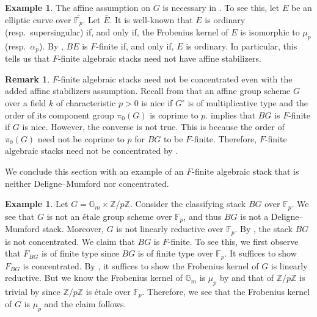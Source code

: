\documentclass[11pt]{amsart}
\theoremstyle{plain}
\theoremstyle{definition}
\newtheorem{example}[theorem]{Example}
\newtheorem{remark}[theorem]{Remark}
\numberwithin{equation}{section}
\numberwithin{theorem}{section}
\begin{document}
\begin{example}
    \label{ex:F-finite_elliptic_curves}
    The affine assumption on $G$ is necessary in . 
    To see this, let $E$ be an elliptic curve over $\overline{\mathbb{F}_p}$. 
    Let $\overline{E}$. 
    It is well-known that $E$ is ordinary (resp.\ supersingular) if, and only if, the Frobenius kernel of $E$ is isomorphic to $\mu_p$ (resp.\ $\alpha_p$). 
    By , $BE$ is $F$-finite if, and only if, $E$ is ordinary. 
    In particular, this tells us that $F$-finite algebraic stacks need not have affine stabilizers.
\end{example}

\begin{remark}
    $F$-finite algebraic stacks need not be concentrated even with the added affine stabilizers assumption. 
    Recall from \cite[Definition 1.1]{Hall/Rydh:2015} that an affine group scheme $G$ over a field $k$ of characteristic $p>0$ is nice if $G^\circ$ is of multiplicative type and the order of its component group $\pi_0(G)$ is coprime to $p$. 
     implies that $BG$ is $F$-finite if $G$ is nice. 
    However, the converse is not true. 
    This is because the order of $\pi_0(G)$ need not be coprime to $p$ for $BG$ to be $F$-finite. 
    Therefore, $F$-finite algebraic stacks need not be concentrated by \cite[Theorem B \& C]{Hall/Rydh:2015}.
\end{remark}

We conclude this section with an example of an $F$-finite algebraic stack that is neither Deligne--Mumford nor concentrated. 

\begin{example}
    \label{ex:F-finite_non_DM_non_tame}
    Let $G=\mathbb{G}_m\times\mathbb{Z}/p\mathbb{Z}$. 
    Consider the classifying stack $BG$ over $\mathbb{F}_p$. 
    We see that $G$ is not an \'{e}tale group scheme over $\mathbb{F}_p$, and thus $BG$ is not a Deligne--Mumford stack. 
    Moreover, $G$ is not linearly reductive over $\mathbb{F}_p$. 
    By \cite[Theorem B and C]{Hall/Rydh:2015}, the stack $BG$ is not concentrated.
    We claim that $BG$ is $F$-finite. 
    To see this, we first observe that $F_{BG}$ is of finite type since $BG$ is of finite type over $\mathbb{F}_p$. 
    It suffices to show $F_{BG}$ is concentrated. 
    By , it suffices to show the Frobenius kernel of $G$ is linearly reductive. 
    But we know the Frobenius kernel of $\mathbb{G}_m$ is $\mu_p$ by  and that of $\mathbb{Z}/p\mathbb{Z}$ is trivial by  since $\mathbb{Z}/p\mathbb{Z}$ is \'{e}tale over $\mathbb{F}_p$. 
    Therefore, we see that the Frobenius kernel of $G$ is $\mu_p$ and the claim follows. 
\end{example}
\end{document}
